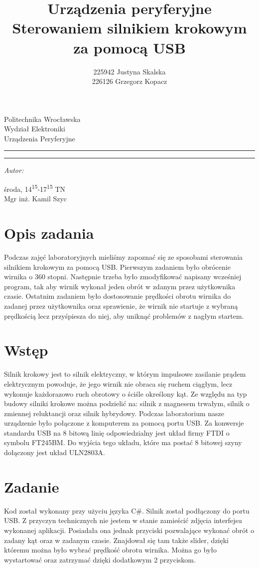 \documentclass{article}
\author{225942 Justyna Skalska \\
        226126 Grzegorz Kopacz}
\title{\textbf{Urządzenia peryferyjne}\\
\normalsize{Sterowaniem silnikiem krokowym za pomocą USB}}
\makeatletter
\newcommand{\linia}{\rule{\linewidth}{0.4mm}}
\renewcommand{\maketitle}{\begin{titlepage}
    \vspace*{1cm}
    \begin{center}\small
    Politechnika Wrocławska\\
    Wydział Elektroniki\\
    Urządzenia Peryferyjne
    \end{center}
    \vspace{3cm}
    \noindent\linia
    \begin{center}
      \LARGE \textsc{\@title}
         \end{center}
     \linia
    \vspace{0.5cm}
    \begin{flushright}
    \begin{minipage}{7cm}
    \textit{\small Autor:}\\
    \normalsize \textsc{\@author} \par
    \end{minipage}
    \vspace{5cm}

     {\small środa, 14\textsuperscript{15}-17\textsuperscript{15} TN}\\
        Mgr inż. Kamil Szyc
     \end{flushright}
    \vspace*{\stretch{6}}
    \begin{center}
    \@date
    \end{center}
  \end{titlepage}
}
\makeatother
\begin{document}
\maketitle
\tableofcontents

\newpage

\section{Opis zadania}
Podczas zajęć laboratoryjnych mieliśmy zapoznać się ze sposobami sterowania silnikiem krokowym za pomocą USB. Pierwszym zadaniem było obrócenie wirnika o 360 stopni. Następnie trzeba było zmodyfikować napisany wcześniej program, tak aby wirnik wykonał jeden obrót w zdanym przez użytkownika czasie. Ostatnim zadaniem było dostosowanie prędkości obrotu wirnika do zadanej przez użytkownika oraz sprawienie, że wirnik nie startuje z wybraną prędkością lecz przyśpiesza do niej, aby uniknąć problemów z nagłym startem. 

\section{Wstęp} 
Silnik krokowy jest to silnik elektryczny, w którym impulsowe zasilanie prądem elektrycznym powoduje, że jego wirnik nie obraca się ruchem ciągłym, lecz wykonuje każdorazowo ruch obrotowy o ściśle określony kąt. Ze względu na typ budowy silniki krokowe można podzielić na: silnik z magnesem trwałym, silnik o zmiennej reluktancji oraz silnik hybrydowy. 
Podczas laboratorium nasze urządzenie było połączone z komputerem za pomocą portu USB. Za konwersje standardu USB na 8 bitową linię odpowiedzialny jest układ firmy FTDI o symbolu FT245BM. Do wyjścia tego układu, które ma postać 8 bitowej szyny dołączony jest układ ULN2803A.\cite{lab}

\section{Zadanie}
Kod został wykonany przy użyciu języka C\#. Silnik został podłączony do portu USB. Z przyczyn technicznych nie jestem w stanie zamieścić zdjęcia interfejsu wykonanej aplikacji. Posiadała ona jednak przyciski pozwalające wykonać obrót o zadany kąt oraz w zadanym czasie. Znajdował się tam także slider, dzięki któremu można było wybrać prędkość obrotu wirnika. Można go było wystartować oraz zatrzymać dzięki dodatkowym 2 przyciskom.
\newline
\newline
\end{document}
